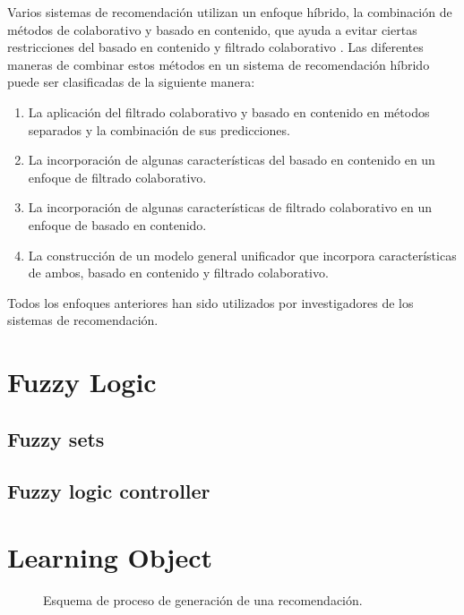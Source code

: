 \documentclass[12pt,letterpaper,oneside] {memoir}
\begin{document}
Varios sistemas de recomendación utilizan un enfoque híbrido, la combinación de métodos de colaborativo y basado en contenido, que ayuda a evitar ciertas restricciones del basado en contenido y filtrado colaborativo \citep{Balabanovic1997, Claypool1999, Schein2002,Soboroff1999, Basu1998}. Las diferentes maneras de combinar estos métodos en un sistema de recomendación híbrido puede ser clasificadas de la siguiente manera:
\begin{enumerate}
\item La aplicación del filtrado colaborativo y basado en contenido en métodos separados y la combinación de sus predicciones.
\item La incorporación de algunas características del basado en contenido en un enfoque de filtrado colaborativo.
\item La incorporación de algunas características de filtrado colaborativo en un enfoque de basado en contenido.
\item La construcción de un modelo general unificador que incorpora características de ambos, basado en contenido y filtrado colaborativo.
\end{enumerate}

Todos los enfoques anteriores han sido utilizados por investigadores de los sistemas de recomendación.

\section{Fuzzy Logic}
\subsection{Fuzzy sets}
\subsection{Fuzzy logic controller}
\section{Learning Object}

\begin{figure}[H] 
 \centering 
{} \caption{Esquema de proceso de generación de una recomendación.} 
 \label{fig:procesoRecomendacion} 
\end{figure}
\end{document}
